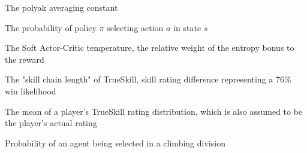 \begin{description}[style=sameline,leftmargin=3cm,font=\normalfont]
  \item[$\psi$] The polyak averaging constant\\
  \item[$P_{\pi, s}(a)$] The probability of policy $\pi$ selecting action $a$ in state $s$\\
  \item[$\alpha$] The Soft Actor-Critic temperature, the relative weight of the entropy bonus to the reward\\
  \item[$\beta$] The "skill chain length" of TrueSkill, skill rating difference representing a 76\% win likelihood\\
  \item[$\mu$] The mean of a player's TrueSkill rating distribution, which is also assumed to be the player's actual rating\\
  \item[$p(Selected)$] Probability of an agent being selected in a climbing division\\
\end{description}